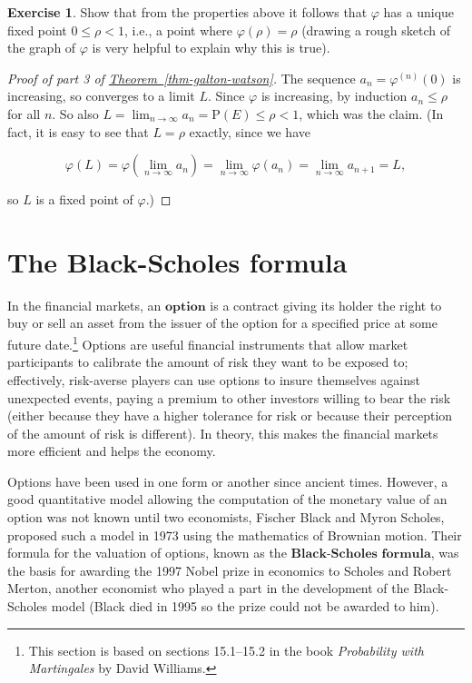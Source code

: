 \documentclass[11pt]{report}
\theoremstyle{plain}
\theoremstyle{definition}
\newtheorem{xexercise}[thm]{Exercise}
\begin{document}
\begin{xexercise}
Show that from the properties above it follows that
$\varphi$ has a unique fixed point $0\le \rho<1$,
i.e., a point where $\varphi(\rho)=\rho$ (drawing a
rough sketch of the graph of $\varphi$ is very
helpful to explain why this is true).
\end{xexercise}

\begin{proof}[Proof of part 3 of \texorpdfstring{\hyperref[thm-galton-watson]{Theorem~\ref*{thm-galton-watson}}}{Theorem}]
The sequence $a_n = \varphi^{(n)}(0)$ is increasing,
so converges to a limit $L$. Since $\varphi$ is
increasing, by induction $a_n\le \rho$ for all $n$.
So also
$L=\lim_{n\to\infty} a_n = \mathrm{P}(E) \le \rho <1$,
which was the claim. (In fact, it is easy to see that
$L=\rho$ exactly, since we have

\[
\varphi(L)=\varphi(\lim_{n\to\infty} a_n) = \lim_{n\to\infty} \varphi(a_n) = \lim_{n\to\infty} a_{n+1} = L,
\]

\noindent so $L$ is a fixed point of $\varphi$.)
\end{proof}

\section{The Black-Scholes formula}

In the financial markets, an $\textbf{option}$ is a
contract giving its holder the right to buy or sell an
asset from the issuer of the option for a specified
price at some future date.\footnote{This section is based on sections 15.1--15.2 in the
book \emph{Probability with Martingales} by David Williams.}
Options are useful financial instruments that allow
market participants to calibrate the amount of risk
they want to be exposed to; effectively, risk-averse
players can use options to insure themselves against
unexpected events, paying a premium to other investors
willing to bear the risk (either because they have a
higher tolerance for risk or because their perception
of the amount of risk is different). In theory, this
makes the financial markets more efficient and helps
the economy.

Options have been used in one form or another since
ancient times. However, a good quantitative model
allowing the computation of the monetary value of an
option was not known until two economists, Fischer
Black and Myron Scholes, proposed such a model in 1973
using the mathematics of Brownian motion. Their
formula for the valuation of options, known as the
$\textbf{Black-Scholes formula}$, was the basis for
awarding the 1997 Nobel prize in economics to Scholes
and Robert Merton, another economist who played a part
in the development of the Black-Scholes model (Black
died in 1995 so the prize could not be awarded to
him).
\end{document}

